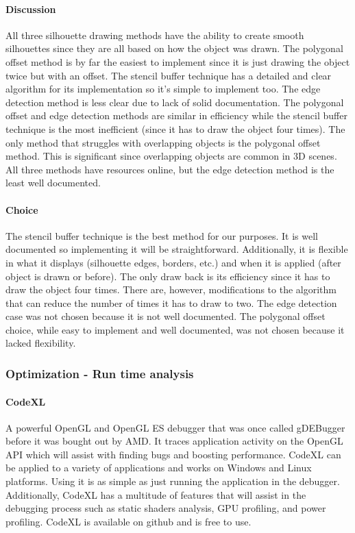 \newpage

\paragraph{Discussion}
All three silhouette drawing methods have the ability to create smooth silhouettes since they are all based on how the object was drawn.
The polygonal offset method is by far the easiest to implement since it is just drawing the object twice but with an offset.
The stencil buffer technique has a detailed and clear algorithm for its implementation so it's simple to implement too.
The edge detection method is less clear due to lack of solid documentation.
The polygonal offset and edge detection methods are similar in efficiency while the stencil buffer technique is the most inefficient (since it has to draw the object four times).
The only method that struggles with overlapping objects is the polygonal offset method. 
This is significant since overlapping objects are common in 3D scenes.
All three methods have resources online, but the edge detection method is the least well documented.

\paragraph{Choice}
The stencil buffer technique is the best method for our purposes.
It is well documented so implementing it will be straightforward.
Additionally, it is flexible in what it displays (silhouette edges, borders, etc.) and when it is applied (after object is drawn or before). 
The only draw back is its efficiency since it has to draw the object four times.
There are, however, modifications to the algorithm that can reduce the number of times it has to draw to two. \cite{siledges}
The edge detection case was not chosen because it is not well documented.
The polygonal offset choice, while easy to implement and well documented, was not chosen because it lacked flexibility.

\newpage

\subsubsection{Optimization - Run time analysis}

\paragraph{CodeXL}
A powerful OpenGL and OpenGL ES debugger that was once called gDEBugger before it was bought out by AMD.
It traces application activity on the OpenGL API which will assist with finding bugs and boosting performance.
CodeXL can be applied to a variety of applications and works on Windows and Linux platforms.
Using it is as simple as just running the application in the debugger.
Additionally, CodeXL has a multitude of features that will assist in the debugging process such as static shaders analysis, GPU profiling, and power profiling. \cite{codexl}
CodeXL is available on github and is free to use.

